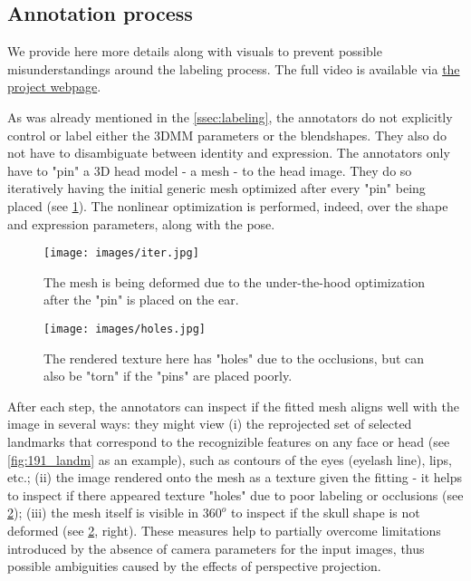 \documentclass[10pt,twocolumn,letterpaper]{article}
\begin{document}
\subsection{Annotation process}\label{ssec:annotation_process_detailed}

We provide here more details along with visuals to prevent possible misunderstandings around the labeling process. The full video is available via \href{https://p.farm/research/dad-3dheads}{the project webpage}.

As was already mentioned in the \cref{ssec:labeling}, the annotators do not explicitly control or label either the 3DMM parameters or the blendshapes. 
They also do not have to disambiguate between identity and expression.
The annotators only have to "pin" a 3D head model - a mesh - to the head image.
They do so iteratively having the initial generic mesh optimized after every "pin" being placed (see \cref{fig:iteration}).
The nonlinear optimization is performed, indeed, over the shape and expression parameters, along with the pose.
\begin{figure}[h!]
     \centering
      \texttt{[image: images/iter.jpg]}
     \caption{The mesh is being deformed due to the under-the-hood optimization after the "pin" is placed on the ear.}
     \label{fig:iteration}
\end{figure}
\begin{figure}[h!]
     \centering
      \texttt{[image: images/holes.jpg]}
     \caption{The rendered texture here has "holes" due to the occlusions, but can also be "torn" if the "pins" are placed poorly.}
     \label{fig:holes}
\end{figure}

After each step, the annotators can inspect if the fitted mesh aligns well with the image in several ways: they might view (i) the reprojected set of selected landmarks that correspond to the recognizible features on any face or head (see \cref{fig:191_landm} as an example), such as contours of the eyes (eyelash line), lips, etc.; (ii) the image rendered onto the mesh as a texture given the fitting - it helps to inspect if there appeared texture "holes" due to poor labeling or occlusions (see \cref{fig:holes}); (iii) the mesh itself is visible in $360^o$ to inspect if the skull shape is not deformed (see \cref{fig:holes}, right).
These measures help to partially overcome limitations introduced by the absence of camera parameters for the input images, thus possible ambiguities caused by the effects of perspective projection.
\end{document}
